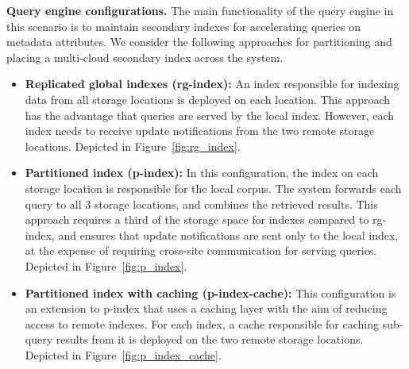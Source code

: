 \bigskip
\noindent
\textbf{Query engine configurations.}
The main functionality of the query engine in this scenario is to maintain secondary indexes for accelerating queries on
metadata attributes.
We consider the following approaches for partitioning and placing a multi-cloud secondary index across the system.

\begin{itemize}
  \item \textbf{Replicated global indexes (rg-index):}
  An index responsible for indexing data from all storage locations is deployed on each location.
  This approach has the advantage that queries are served by the local index.
  However, each index needs to receive update notifications from the two remote storage locations.
  Depicted in Figure~\ref{fig:rg_index}.

  \item \textbf{Partitioned index (p-index):}
  In this configuration, the index on each storage location is responsible for the local corpus.
  The system forwards each query to all 3 storage locations, and combines the retrieved results.
  This approach requires a third of the storage space for indexes compared to rg-index,
  and ensures that update notifications are sent only to the local index,
  at the expense of requiring cross-site communication for serving queries.
  Depicted in Figure~\ref{fig:p_index}.

  \item \textbf{Partitioned index with caching (p-index-cache):}
  This configuration is an extension to p-index that uses a caching layer with the aim of reducing access to remote indexes.
  For each index, a cache responsible for caching sub-query results from it is deployed on the two remote storage locations.
  Depicted in Figure~\ref{fig:p_index_cache}.
\end{itemize}

